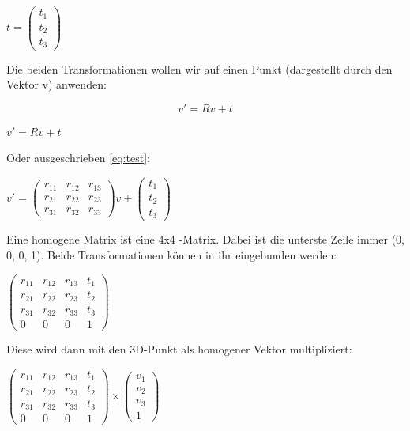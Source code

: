 		\( t = \begin{pmatrix}
		t_1 \\ t_2 \\ t_3
		\end{pmatrix} \)
		
		Die beiden Transformationen wollen wir auf einen Punkt (dargestellt durch den Vektor v) anwenden:
		
		\begin{equation}
			v' = Rv + t
			\label{eq:test}
		\end{equation}
		
		\( v' = Rv + t \)
		
		
		
		Oder ausgeschrieben \ref{eq:test}:
		
		\( v' = \begin{pmatrix}
		r_{11} & r_{12} & r_{13} \\ r_{21} & r_{22} & r_{23} \\ r_{31} & r_{32} & r_{33}
		\end{pmatrix} v + 
		\begin{pmatrix}
		t_1 \\ t_2 \\ t_3
		\end{pmatrix}\)
		
		Eine homogene Matrix ist eine 4x4 -Matrix. Dabei ist die unterste Zeile immer (0, 0, 0, 1). Beide Transformationen können in ihr eingebunden werden:
		
		\( \begin{pmatrix}
		r_{11} & r_{12} & r_{13} & t_1 \\ r_{21} & r_{22} & r_{23} & t_2 \\ 
		r_{31} & r_{32} & r_{33} & t_3 \\ 0 & 0 & 0 & 1
		\end{pmatrix} \)
		
		Diese wird dann mit den 3D-Punkt als homogener Vektor multipliziert:
		
		\( \begin{pmatrix}
		r_{11} & r_{12} & r_{13} & t_1 \\ r_{21} & r_{22} & r_{23} & t_2 \\ 
		r_{31} & r_{32} & r_{33} & t_3 \\ 0 & 0 & 0 & 1
		\end{pmatrix} \times
		\begin{pmatrix}
		v_1 \\ v_2 \\ v_3 \\ 1
		\end{pmatrix} \)
		
